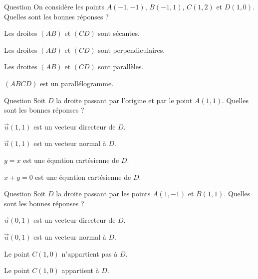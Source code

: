 \begin{multi}[multiple,feedback=
{On a \(\overrightarrow{AB}=(0,2)=-\overrightarrow{CD}\), donc les droites \((AB)\) et \((CD)\) sont parallèles. De plus, \(AB=CD\), donc \((ABCD)\) est un parallélogramme.
}]{Question}
On considère les points \(A(-1,-1)\), \(B(-1,1)\), \(C(1,2)\) et \(D(1,0)\). Quelles sont les bonnes réponses ?

    \item Les droites \((AB)\) et \((CD)\) sont sécantes.
    \item Les droites \((AB)\) et \((CD)\) sont perpendiculaires.
    \item* Les droites \((AB)\) et \((CD)\) sont parallèles.
    \item* \((ABCD)\) est un parallélogramme.
\end{multi}


\begin{multi}[multiple,feedback=
{La droite \(D\) est dirigée par le vecteur \(\overrightarrow{OA}=\vec{u}(1,1)\) et \(M(x,y)\in D \Leftrightarrow \mbox{det}(\overrightarrow{OM},\overrightarrow{OA})=0\Leftrightarrow x-y=0\). Ceci donne une équation cartésienne de \(D\).
}]{Question}
Soit \(D\) la droite passant par l'origine et par le point \(A(1,1)\). Quelles sont les bonnes réponses ?

    \item* \(\vec{u}(1,1)\) est un vecteur directeur de \(D\).
    \item \(\vec{u}(1,1)\) est un vecteur normal à \(D\).
    \item* \(y=x\) est une équation cartésienne de \(D\).
    \item \(x+y=0\) est une équation cartésienne de \(D\).
\end{multi}


\begin{multi}[multiple,feedback=
{Le vecteur \(\overrightarrow{AB}=(0,2)\) est un vecteur directeur de \(D\). Par ailleurs, \(\overrightarrow{AC}=(0,1)=\frac{1}{2}\overrightarrow{AB}\). Donc \(C\in D\).
}]{Question}
Soit \(D\) la droite passant par les points \(A(1,-1)\) et \(B(1,1)\). Quelles sont les bonnes réponses ?

    \item* \(\vec{u}(0,1)\) est un vecteur directeur de \(D\).
    \item \(\vec{u}(0,1)\) est un vecteur normal à \(D\).
    \item Le point \(C(1,0)\) n'appartient pas à \(D\).
    \item* Le point \(C(1,0)\) appartient à \(D\).
\end{multi}


